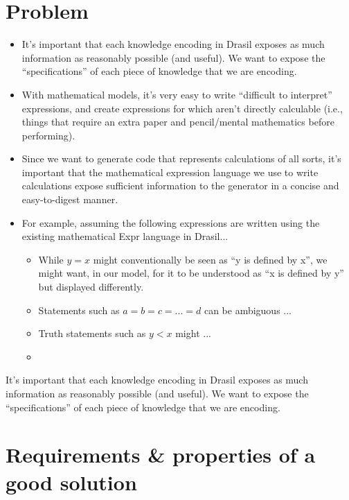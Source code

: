 
\section{Problem}

\begin{itemize}
    \item It's important that each knowledge encoding in Drasil exposes as much information as reasonably possible (and useful).  We want to expose the ``specifications'' of each piece of knowledge that we are encoding.
    \item With mathematical models, it's very easy to write ``difficult to interpret'' expressions, and create expressions for which aren't directly calculable (i.e., things that require an extra paper and pencil/mental mathematics before performing).
    \item Since we want to generate code that represents calculations of all sorts, it's important that the mathematical expression language we use to write calculations expose sufficient information to the generator in a concise and easy-to-digest manner.
    \item For example, assuming the following expressions are written using the existing mathematical Expr language in Drasil...
          \begin{itemize}
              \item While \(y = x\) might conventionally be seen as ``y is defined by x'', we might want, in our model, for it to be understood as ``x is defined by y'' but displayed differently.
              \item Statements such as \(a = b = c = ... = d\) can be ambiguous ...
              \item Truth statements such as \(y < x\) might ...
              \item {}
          \end{itemize}
\end{itemize}

It's important that each knowledge encoding in Drasil exposes as much information as reasonably possible (and useful).  We want to expose the ``specifications'' of each piece of knowledge that we are encoding.

\section{Requirements \& properties of a good solution}

